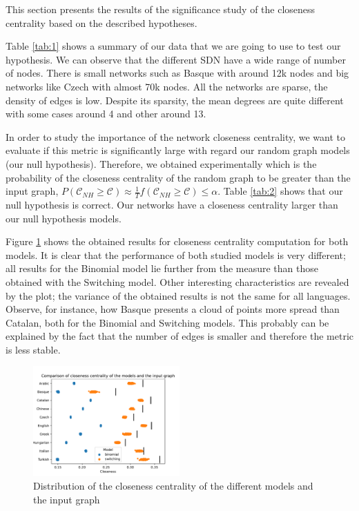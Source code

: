 This section presents the results of the significance study of the closeness centrality based on the described hypotheses.

Table \ref{tab:1} shows a summary of our data that we are going to use to test our hypothesis. We can observe that the different SDN have a wide range of number of nodes. There is small networks such as Basque with around 12k nodes and big networks like Czech with almost 70k nodes. All the networks are sparse, the density of edges is low. Despite its sparsity, the mean degrees are quite different with some cases around 4 and other around 13.



In order to study the importance of the network closeness centrality, we want to evaluate if this metric is significantly large with regard our random graph models (our null hypothesis). Therefore, we obtained experimentally which is the probability of the closeness centrality of the random graph to be greater than the input graph, $P(\mathcal{C}_{NH} \geq \mathcal{C}) \approx \frac{1}{T}f(\mathcal{C}_{NH} \geq \mathcal{C}) \leq \alpha$. Table \ref{tab:2} shows that our null hypothesis is correct. Our networks have a closeness centrality larger than our null hypothesis models.



Figure \ref{fig:closeness_distribution} shows the obtained results for closeness centrality computation for both models. It is clear that the performance of both studied models is very different; all results for the Binomial model lie further from the measure than those obtained with the Switching model. Other interesting characteristics are revealed by the plot; the variance of the obtained results is not the same for all languages. Observe, for instance, how Basque presents a cloud of points more spread than Catalan, both for the Binomial and Switching models. This probably can be explained by the fact that the number of edges is smaller and therefore the metric is less stable.
\begin{figure}[!htp]
    \centering
    \includegraphics[width=0.5\textwidth]{figures/closeness_distribution.pdf}
    \caption{Distribution of the closeness centrality of the different models and the input graph }
    \label{fig:closeness_distribution}
\end{figure}